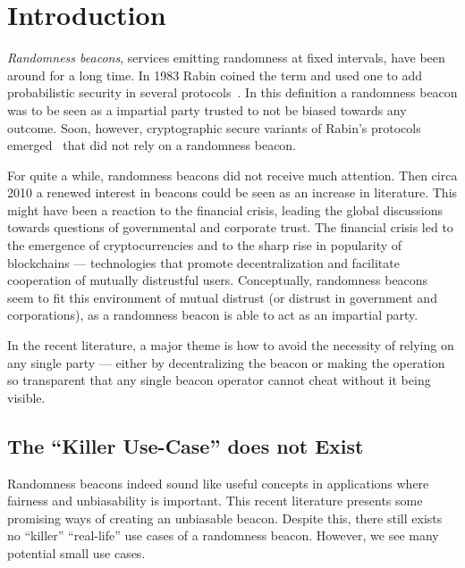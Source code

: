 \section{Introduction}

\emph{Randomness beacons}, services emitting randomness at fixed intervals, have been around for a long time.
In 1983 Rabin coined the term and used one to add probabilistic security in several protocols~.
In this definition a randomness beacon was to be seen as a impartial party trusted to not be biased towards any outcome.
Soon, however, cryptographic secure variants of Rabin's protocols emerged~ that did not rely on a randomness beacon.

For quite a while, randomness beacons did not receive much attention. Then circa 2010 a renewed interest in beacons could be seen as an increase in literature.
This might have been a reaction to the financial crisis, leading the global discussions towards questions of governmental and corporate trust.
The financial crisis led to the emergence of cryptocurrencies and to the sharp rise in popularity of blockchains --- technologies that promote decentralization and facilitate cooperation of mutually distrustful users.
Conceptually, randomness beacons seem to fit this environment of mutual distrust (or distrust in government and corporations), as a randomness beacon is able to act as an impartial party.

In the recent literature, a major theme is how to avoid the necessity of relying on any single party --- either by decentralizing the beacon or making the operation so transparent that any single beacon operator cannot cheat without it being visible.

\subsection{The \enquote{Killer Use-Case} does not Exist}

Randomness beacons indeed sound like useful concepts in applications where fairness and unbiasability is important.
This recent literature presents some promising ways of creating an unbiasable beacon. Despite this, there still exists no \enquote{killer} \enquote{real-life} use cases of a randomness beacon.  However, we see many potential small use cases.


